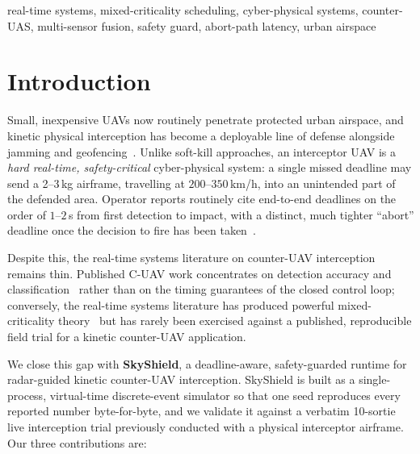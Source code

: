\documentclass[conference]{IEEEtran}
\begin{document}
\begin{IEEEkeywords}
real-time systems, mixed-criticality scheduling, cyber-physical systems,
counter-UAS, multi-sensor fusion, safety guard, abort-path latency,
urban airspace
\end{IEEEkeywords}

\section{Introduction}
Small, inexpensive UAVs now routinely penetrate protected urban airspace,
and kinetic physical interception has become a deployable line of defense
alongside jamming and geofencing~\cite{usaf2017cuas,kratky2017countering,
samaras2019deep}.  Unlike soft-kill approaches, an interceptor UAV is a
\emph{hard real-time, safety-critical} cyber-physical system: a single
missed deadline may send a 2--3\,kg airframe, travelling at
$200$--$350$\,km/h, into an unintended part of the defended area.  Operator
reports routinely cite end-to-end deadlines on the order of $1$--$2\,$s from
first detection to impact, with a distinct, much tighter ``abort'' deadline
once the decision to fire has been taken~\cite{hsu2021counter,guerra2021drone}.

Despite this, the real-time systems literature on counter-UAV interception
remains thin.  Published C-UAV work concentrates on detection accuracy and
classification~\cite{samaras2019deep,taha2019machine,nguyen2021drone,
bisio2018unmanned,ganti2016implementation} rather than on the timing
guarantees of the closed control loop; conversely, the real-time systems
literature has produced powerful mixed-criticality theory~\cite{
vestal2007preemptive,baruah2011response,burns2017mixed,gschwandtner2014operating}
but has rarely been exercised against a published, reproducible field trial
for a kinetic counter-UAV application.

We close this gap with \textbf{SkyShield}, a deadline-aware, safety-guarded
runtime for radar-guided kinetic counter-UAV interception.  SkyShield is
built as a single-process, virtual-time discrete-event simulator so that one
seed reproduces every reported number byte-for-byte, and we validate it
against a verbatim 10-sortie live interception trial previously conducted
with a physical interceptor airframe.  Our three contributions are:
\end{document}
